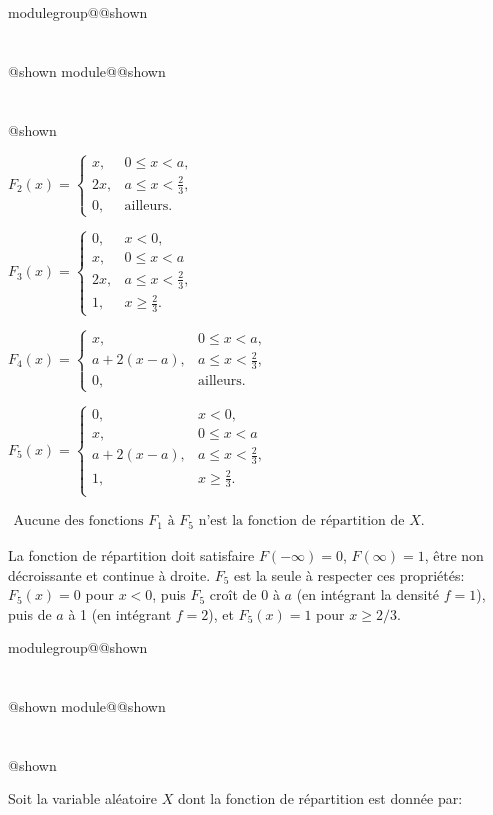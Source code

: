 \documentclass{Evaluation}
\makeatletter
\newcommand{\currentmodulekey}{}
\newcommand{\currentmoduletitle}{}
\newcommand{\currentgroupkey}{}
\newcommand{\currentgrouptitle}{}
\newcommand{\showmoduleifneeded}{%
  \ifx\currentgroupkey\empty\else
    \expandafter\ifx\csname modulegroup@\currentgroupkey @shown\endcsname\relax
      \section*{\currentgrouptitle}%
      \expandafter\gdef\csname modulegroup@\currentgroupkey @shown\endcsname{1}%
    \fi
  \fi
  \expandafter\ifx\csname module@\currentmodulekey @shown\endcsname\relax
    \section*{\currentmoduletitle}%
    \expandafter\gdef\csname module@\currentmodulekey @shown\endcsname{1}%
  \fi
}
\newenvironment{A25}{\showmoduleifneeded}{}
\makeatother
\begin{document}
\begin{questions}
\begin{A25}
\begin{checkboxes}
     \choice $F_2(x)=\left\{\begin{array}{ll}
     x, & 0\le x<a, \\
     2x, & a\le x < \frac{2}{3}, \\
     0, & \text{ailleurs}.
     \end{array}\right.$

     \choice $F_3(x)=\left\{\begin{array}{ll}
     0, & x<0,\\
     x, & 0\le x<a \\ 2x, & a\le x < \frac{2}{3}, \\
     1, & x\ge\frac{2}{3}.
     \end{array}\right.$

     \choice $F_4(x)=\left\{\begin{array}{ll}
     x, & 0\le x<a, \\
     a+2(x-a), & a\le x < \frac{2}{3}, \\
     0, & \text{ailleurs}.
     \end{array}\right.$

     \CorrectChoice $F_5(x)=\left\{\begin{array}{ll}
     0, & x<0,\\
     x, & 0\le x<a \\
     a+2(x-a), & a\le x < \frac{2}{3}, \\
     1, & x\ge\frac{2}{3}.\\
     \end{array}\right.$


     \choice $\begin{array}{ll}
     \text{Aucune des fonctions\ }
     \text{$F_1$ à $F_5$ n'est la\ }
     \text{fonction de répartition de $X$.}
     \end{array}$
  \end{checkboxes}\medskip

\begin{solution}
    La fonction de répartition doit satisfaire $F(-\infty)=0$, $F(\infty)=1$, être non décroissante et continue à droite. $F_5$ est la seule à respecter ces propriétés: $F_5(x)=0$ pour $x<0$, puis $F_5$ croît de 0 à $a$ (en intégrant la densité $f=1$), puis de $a$ à 1 (en intégrant $f=2$), et $F_5(x)=1$ pour $x\geq 2/3$.
\end{solution}
\end{A25}

\begin{A25}
\question {} %
Soit la variable aléatoire $X$ dont la fonction de répartition est donnée par:


\end{A25}
\end{questions}
\end{document}
